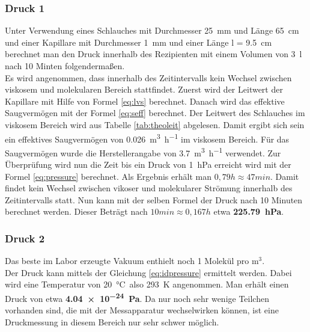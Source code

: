 \documentclass[a4paper,usenatbib]{aspdoc}
\begin{document}
            \subsubsection{Druck 1}
                Unter Verwendung eines Schlauches mit Durchmesser \SI{25}{\milli\metre} und Länge \SI{65}{\cm} und einer Kapillare mit Durchmesser \SI{1}{\milli\metre} und einer Länge l = \SI{9,5}{\cm} berechnet man den Druck innerhalb des Rezipienten mit einem Volumen von \SI{3}{\litre} nach 10 Minten folgendermaßen.\\
                Es wird angenommen, dass innerhalb des Zeitintervalls kein Wechsel zwischen viskosem und molekularen Bereich stattfindet. Zuerst wird der Leitwert der Kapillare mit Hilfe von Formel \ref{eq:lvs} berechnet. Danach wird das effektive Saugvermögen mit der Formel \ref{eq:seff} berechnet. Der Leitwert des Schlauches im viskosem Bereich wird aus Tabelle \ref{tab:theoleit} abgelesen. Damit ergibt sich sein ein effektives Saugvermögen von \SI[per-mode = fraction]{0,026}{\cubic\metre\per\hour} im viskosem Bereich. Für das Saugvermögen wurde die Herstellerangabe von \SI[per-mode = fraction]{3,7}{\cubic\metre\per\hour} verwendet. Zur Überprüfung wird nun die Zeit bis ein Druck von \SI{1}{\hecto\pascal} erreicht wird mit der Formel \ref{eq:pressure} berechnet. Als Ergebnis erhält man $0,79 h \approx 47 min$. Damit findet kein Wechsel zwischen vikoser und molekularer Strömung innerhalb des Zeitintervalls statt. Nun kann mit der selben Formel der Druck nach 10 Minuten berechnet werden. Dieser Beträgt nach $10 min \approx 0,167 h$ etwa \textbf{\SI[detect-weight]{225,79}{\hecto\pascal}}.
            
            \subsubsection{Druck 2}
                Das beste im Labor erzeugte Vakuum enthielt noch 1 Molekül pro $\mathrm{m}^3$.\\
                Der Druck kann mittels der Gleichung \ref{eq:idpressure} ermittelt werden. Dabei wird eine Temperatur von \SI{20}{\degreeCelsius}\, also \SI{293}{\kelvin} angenommen. Man erhält einen Druck von etwa \textbf{ \SI[detect-weight]{4,04e-24}{\pascal}}. Da nur noch sehr wenige Teilchen vorhanden sind, die mit der Messapparatur wechselwirken können, ist eine Druckmessung in diesem Bereich nur sehr schwer möglich.
                
            
       
\end{document}
